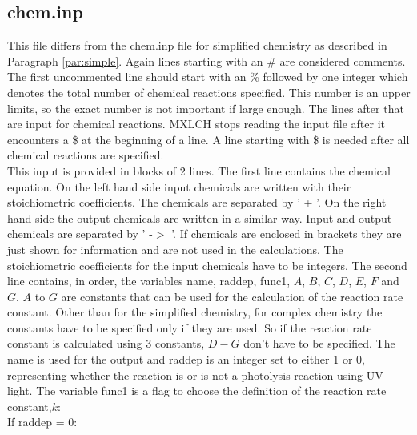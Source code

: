 \documentclass[twoside,11pt,fleqn,a4paper,english,openright]{report}
\begin{document}
\subsection{chem.inp}\label{par:mozartcheminp}
This file differs from the chem.inp file for simplified chemistry as described in Paragraph \ref{par:simple}. Again lines starting with an \# are considered comments. The first uncommented line should start with an \% followed by one integer which denotes the total number of chemical reactions specified. This number is an upper limits, so the exact number is not important if large enough. The lines after that are input for chemical reactions. MXLCH stops reading the input file after it encounters a \$ at the beginning of a line. A line starting with \$ is needed after all chemical reactions are specified.\\
This input is provided in blocks of 2 lines. The first line contains the chemical equation. On the left hand side input chemicals are written with their stoichiometric coefficients. The chemicals are separated by ' + '. On the right hand side the output chemicals are written in a similar way. Input and output chemicals are separated by ' -$>$ '. If chemicals are enclosed in brackets they are just shown for information and are not used in the calculations. The stoichiometric coefficients for the input chemicals have to be integers. The second line contains, in order, the variables name, raddep, func1, $A$, $B$, $C$, $D$, $E$, $F$ and $G$. $A$ to $G$ are constants that can be used for the calculation of the reaction rate constant. Other than for the simplified chemistry, for complex chemistry the constants have to be specified only if they are used. So if the reaction rate constant is calculated using 3 constants, $D - G$ don't have to be specified. The name is used for the output and raddep is an integer set to either 1 or 0, representing whether the reaction is or is not a photolysis reaction using UV light. The variable func1 is a flag to choose the definition of the reaction rate constant,$k$:\\ $\,$\\
				If raddep = 0:\\ 
\end{document}
